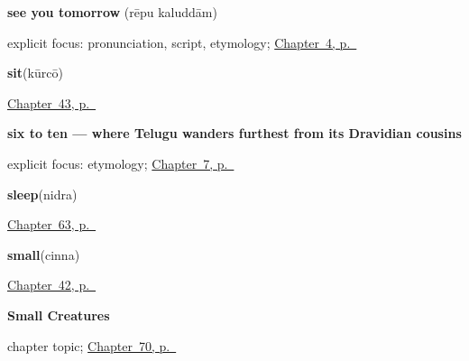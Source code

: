 \noindent\begin{minipage}[t]{\linewidth}
\raggedright
\textbf{see you tomorrow}\enspace\emph{ }\enspace(rēpu kaluddām)\par
\footnotesize explicit focus: pronunciation, script, etymology; \hyperref[ch:farewells]{Chapter~4, p.~\pageref*{ch:farewells}}
\end{minipage}\par\smallskip

\noindent\begin{minipage}[t]{\linewidth}
\raggedright
\textbf{sit}\enspace\emph{}\enspace(kūrcō)\par
\footnotesize \hyperref[ch:te-more-verbs]{Chapter~43, p.~\pageref*{ch:te-more-verbs}}
\end{minipage}\par\smallskip

\noindent\begin{minipage}[t]{\linewidth}
\raggedright
\textbf{six to ten — where Telugu wanders furthest from its Dravidian cousins}\enspace\emph{    }\par
\footnotesize explicit focus: etymology; \hyperref[ch:te-numbers-one-to-ten]{Chapter~7, p.~\pageref*{ch:te-numbers-one-to-ten}}
\end{minipage}\par\smallskip

\noindent\begin{minipage}[t]{\linewidth}
\raggedright
\textbf{sleep}\enspace\emph{}\enspace(nidra)\par
\footnotesize \hyperref[ch:te-health]{Chapter~63, p.~\pageref*{ch:te-health}}
\end{minipage}\par\smallskip

\noindent\begin{minipage}[t]{\linewidth}
\raggedright
\textbf{small}\enspace\emph{}\enspace(cinna)\par
\footnotesize \hyperref[ch:te-describing-things]{Chapter~42, p.~\pageref*{ch:te-describing-things}}
\end{minipage}\par\smallskip

\noindent\begin{minipage}[t]{\linewidth}
\raggedright
\textbf{Small Creatures}\par
\footnotesize chapter topic; \hyperref[ch:te-small-creatures]{Chapter~70, p.~\pageref*{ch:te-small-creatures}}
\end{minipage}\par\smallskip

